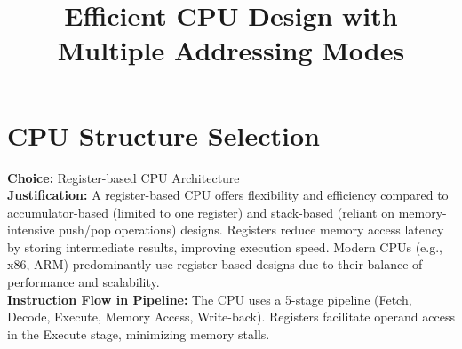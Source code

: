 \documentclass[a4paper,12pt]{article}
\begin{document}
\title{Efficient CPU Design with Multiple Addressing Modes}
\author{} %
\date{} %
\maketitle

\section{CPU Structure Selection}
\textbf{Choice:} Register-based CPU Architecture \\
\textbf{Justification:} A register-based CPU offers flexibility and efficiency compared to accumulator-based (limited to one register) and stack-based (reliant on memory-intensive push/pop operations) designs. Registers reduce memory access latency by storing intermediate results, improving execution speed. Modern CPUs (e.g., x86, ARM) predominantly use register-based designs due to their balance of performance and scalability. \\
\textbf{Instruction Flow in Pipeline:} The CPU uses a 5-stage pipeline (Fetch, Decode, Execute, Memory Access, Write-back). Registers facilitate operand access in the Execute stage, minimizing memory stalls.
\end{document}
